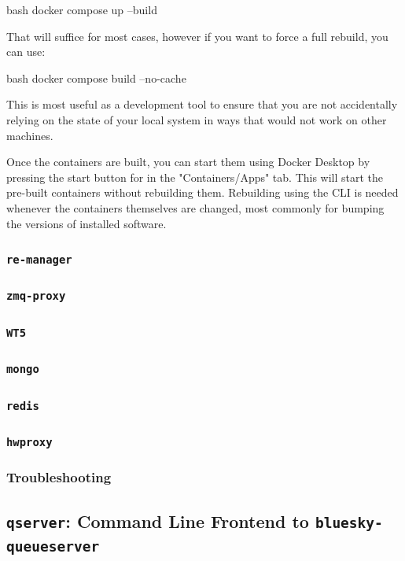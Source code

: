 \begin{codefragment}{bash}
docker compose up --build
\end{codefragment}

That will suffice for most cases, however if you want to force a full rebuild, you can use:

\begin{codefragment}{bash}
docker compose build --no-cache
\end{codefragment}

This is most useful as a development tool to ensure that you are not accidentally relying on the state of your local system in ways that would not work on other machines.

Once the containers are built, you can start them using Docker Desktop by pressing the start button for \biab in the "Containers/Apps" tab.
This will start the pre-built containers without rebuilding them.
Rebuilding using the CLI is needed whenever the containers themselves are changed, most commonly for bumping the versions of installed software.

\subsubsection{\texttt{re-manager}}
\subsubsection{\texttt{zmq-proxy}}
\subsubsection{\texttt{WT5}}
\subsubsection{\texttt{mongo}}
\subsubsection{\texttt{redis}}
\subsubsection{\texttt{hwproxy}}
\subsubsection{Troubleshooting}

\subsection{\texttt{qserver}: Command Line Frontend to \texttt{bluesky-queueserver}}

